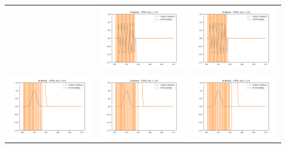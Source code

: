 \documentclass[a4paper,twoside,11pt]{article}
\begin{document}
\begin{table}[h]
\begin{tabular}{ | c | m{5cm} | m{5cm} | }
\begin{minipage}{.3\textwidth}
      \end{minipage}
      &
      \begin{minipage}{.3\textwidth}
        \includegraphics[width=\linewidth, height=2.75cm]{../plots/scheme1-IC4-mu1_0.png}
      \end{minipage}
      &
      \begin{minipage}{.3\textwidth}
        \includegraphics[width=\linewidth, height=2.75cm]{../plots/scheme1-IC4-mu1_5.png}
      \end{minipage} \\
      \begin{minipage}{.3\textwidth}
        \includegraphics[width=\linewidth, height=2.75cm]{../plots/scheme1-IC5-mu0_5.png}
      \end{minipage}
      &
      \begin{minipage}{.3\textwidth}
        \includegraphics[width=\linewidth, height=2.75cm]{../plots/scheme1-IC5-mu1_0.png}
      \end{minipage}
      &
      \begin{minipage}{.3\textwidth}
        \includegraphics[width=\linewidth, height=2.75cm]{../plots/scheme1-IC5-mu1_5.png}
      \end{minipage} \\
      \hline
    \end{tabular}
  \end{table}
\end{document}
